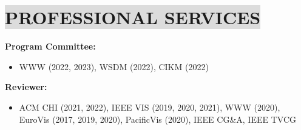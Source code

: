 \section*{
    \colorbox{gainsboro}{PROFESSIONAL SERVICES}
}
\textbf{Program Committee:}
\vspace{-3mm}
\begin{itemize}[leftmargin=5mm,noitemsep,itemsep=0pt]
    \item WWW (2022, 2023), WSDM (2022), CIKM (2022)
\end{itemize}

\textbf{Reviewer:}
\vspace{-3mm}
\begin{itemize}[leftmargin=5mm,noitemsep,itemsep=0pt]
    \item ACM CHI (2021, 2022), IEEE VIS (2019, 2020, 2021), WWW (2020), EuroVis (2017, 2019, 2020), PacificVis (2020), IEEE CG\&A, IEEE TVCG
\end{itemize}

